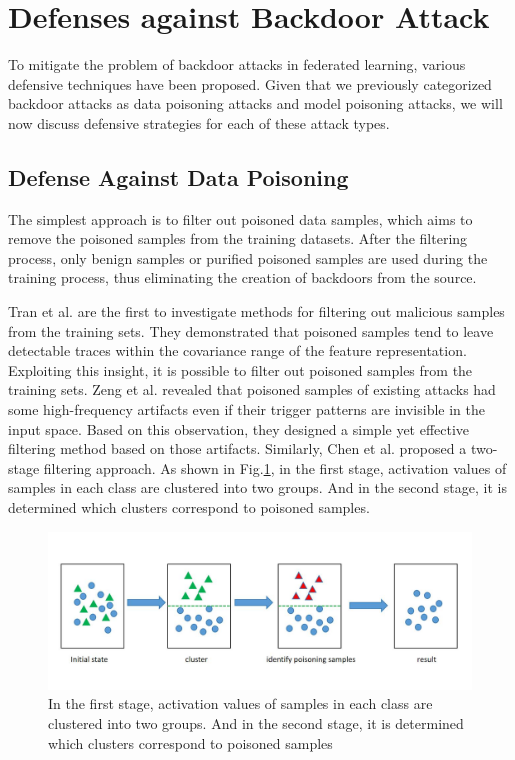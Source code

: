\documentclass[conference]{IEEEtran}
\begin{document}
\section{Defenses against Backdoor Attack}
To mitigate the problem of backdoor attacks in
federated learning, various defensive techniques have been proposed.
Given that we previously categorized backdoor attacks as data poisoning
attacks and model poisoning attacks, we will now discuss defensive strategies
for each of these attack types.

\subsection{Defense Against Data Poisoning}
The simplest approach is to filter out poisoned data samples,
which aims to remove the poisoned samples from the training datasets.
After the filtering process, only benign samples or purified poisoned
samples are used during the training process, thus eliminating the
creation of backdoors from the source.

Tran et al.\cite{b67} are the first to investigate methods for filtering out malicious
samples from the training sets. They demonstrated that poisoned samples tend to
leave detectable traces within the covariance range of the feature representation.
Exploiting this insight, it is possible to filter out poisoned samples from
the training sets. Zeng et al. \cite{b68} revealed that poisoned samples of
existing attacks had some high-frequency artifacts even if their trigger
patterns are invisible in the input space. Based on this observation,
they designed a simple yet effective filtering method based on those artifacts.
Similarly, Chen et al. \cite{b69}proposed a two-stage filtering approach.
As shown in Fig.\ref{fig9}, in the first stage, activation values of samples in each class are clustered
into two groups. And in the second stage, it is determined which clusters
correspond to poisoned samples.


\begin{figure}[htbp]
    \centerline{\includegraphics[width=0.8\linewidth,height=0.3\linewidth]{picture/two-stage-cluster.png}}
    \caption{In the first stage, activation values of samples in each class are clustered
    into two groups. And in the second stage, it is determined which clusters
    correspond to poisoned samples}
    \label{fig9}
\end{figure}
\end{document}

